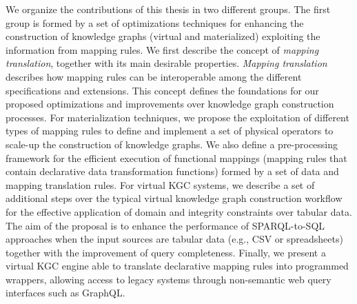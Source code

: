 We organize the contributions of this thesis in two different groups. The first group is formed by a set of optimizations techniques for enhancing the construction of knowledge graphs (virtual and materialized) exploiting the information from mapping rules. We first describe the concept of \textit{mapping translation}, together with its main desirable properties. \textit{Mapping translation} describes how mapping rules can be interoperable among the different specifications and extensions. This concept defines the foundations for our proposed optimizations and improvements over knowledge graph construction processes. For materialization techniques, we propose the exploitation of different types of mapping rules to define and implement a set of physical operators to scale-up the construction of knowledge graphs. We also define a pre-processing framework for the efficient execution of functional mappings (mapping rules that contain declarative data transformation functions) formed by a set of data and mapping translation rules. For virtual KGC systems, we describe a set of additional steps over the typical virtual knowledge graph construction workflow for the effective application of domain and integrity constraints over tabular data. The aim of the proposal is to enhance the performance of SPARQL-to-SQL approaches when the input sources are tabular data (e.g., CSV or spreadsheets) together with the improvement of query completeness. Finally, we present a virtual KGC engine able to translate declarative mapping rules into programmed wrappers, allowing access to legacy systems through non-semantic web query interfaces such as GraphQL.


